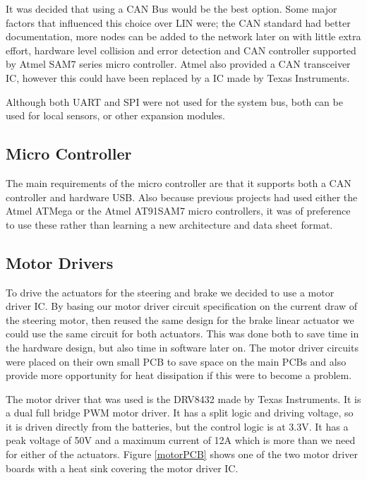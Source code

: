   It was decided that using a CAN Bus would be the best option. Some major
  factors that influenced this choice over LIN were; the CAN standard had better
  documentation, more nodes can be added to the network later on with little
  extra effort, hardware level collision and error detection and CAN controller
  supported by Atmel SAM7 series micro controller. Atmel also provided a CAN
  transceiver IC\cite{ata666}, however this could have been replaced by a IC
  made by Texas Instruments\cite{ti-can-trans}.

  Although both UART and SPI were not used for the system bus, both can be used
  for local sensors, or other expansion modules.

  \subsection{Micro Controller}
  The main requirements of the micro controller are that it supports both a CAN
  controller and hardware USB. Also because previous projects had used either
  the Atmel ATMega or the Atmel AT91SAM7 micro controllers, it was of preference
  to use these rather than learning a new architecture and data sheet format.

  \subsection{Motor Drivers}
  To drive the actuators for the steering and brake we decided to use a motor
  driver IC. By basing our motor driver circuit specification on the current
  draw of the steering motor, then reused the same design for the brake linear
  actuator we could use the same circuit for both actuators. This was done both
  to save time in the hardware design, but also time in software later
  on\cite{Looman_2011}. The motor driver circuits were placed on their own small
  PCB to save space on the main PCBs and also provide more opportunity for heat
  dissipation if this were to become a problem. 

  The motor driver that was used is the DRV8432 made by Texas
  Instruments\cite{ti-motor-driver}. It is a dual full bridge PWM motor driver.
  It has a split logic and driving voltage, so it is driven directly from the
  batteries, but the control logic is at 3.3V. It has a peak voltage of 50V and
  a maximum current of 12A which is more than we need for either of the
  actuators. Figure \ref{motorPCB} shows one of the two motor driver boards with
  a heat sink covering the motor driver IC.

